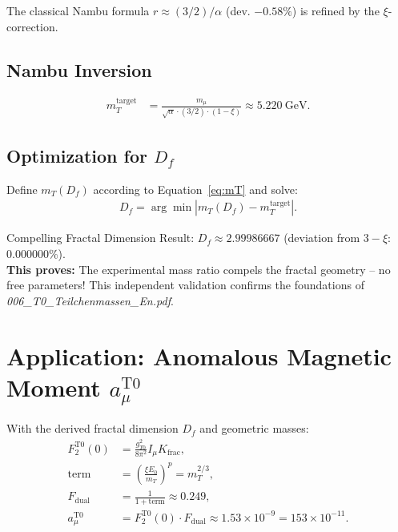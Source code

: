 	The classical Nambu formula $r \approx (3/2)/\alpha$ (dev. $-0.58\%$) is refined by the $\xi$-correction.
	
	\subsection{Nambu Inversion}
	\label{subsec:nambu_inversion}
	
	\begin{align}
		m_T^{\text{target}} &= \frac{m_{\mu}}{\sqrt{\alpha} \cdot (3/2) \cdot (1 - \xi)} \approx \SI{5.220}{\giga\electronvolt}. \label{eq:mTtarget}
	\end{align}
	
	\subsection{Optimization for $D_f$}
	\label{subsec:optimization_df}
	
	Define $m_T(D_f)$ according to Equation~\ref{eq:mT} and solve:
	\begin{align}
		D_f = \arg\min \left| m_T(D_f) - m_T^{\text{target}} \right|. \label{eq:optDf}
	\end{align}
	
	\begin{keyresult}{Compelling Fractal Dimension}{}
		Result: $D_f \approx 2.99986667$ (deviation from $3 - \xi$: $0.000000\%$). \\
		\textbf{This proves:} The experimental mass ratio compels the fractal geometry -- no free parameters! This independent validation confirms the foundations of \emph{006\_T0\_Teilchenmassen\_En.pdf}.
	\end{keyresult}
	
	\section{Application: Anomalous Magnetic Moment $a_{\mu}^{\text{T0}}$}
	\label{sec:application_g2}
	
	With the derived fractal dimension $D_f$ and geometric masses:
	\begin{align}
		F_2^{\text{T0}}(0) &= \frac{g_{T0}^2}{8 \pi^2} I_{\mu} K_{\text{frac}}, \label{eq:F2} \\
		\text{term} &= \left( \frac{\xi E_0}{m_T} \right)^p = m_T^{2/3}, \label{eq:term} \\
		F_{\text{dual}} &= \frac{1}{1 + \text{term}} \approx 0.249, \label{eq:Fdual} \\
		a_{\mu}^{\text{T0}} &= F_2^{\text{T0}}(0) \cdot F_{\text{dual}} \approx 1.53 \times 10^{-9} = 153 \times 10^{-11}. \label{eq:amu}
	\end{align}
	

